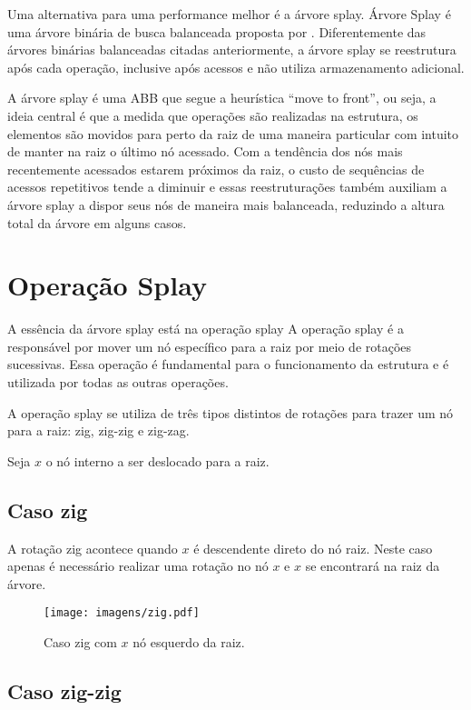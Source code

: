 Uma alternativa para uma performance melhor é a árvore splay. Árvore Splay é uma árvore binária de busca balanceada proposta por \cite{selfadjustingbst}. Diferentemente das árvores binárias balanceadas citadas anteriormente, a árvore splay se reestrutura após cada operação, inclusive após acessos e não utiliza armazenamento adicional.

A árvore splay é uma ABB que segue a heurística “move to front”, ou seja, a ideia central é que a medida que operações são realizadas na estrutura, os elementos são movidos para perto da raiz de uma maneira particular com intuito de manter na raiz o último nó acessado.
Com a tendência dos nós mais recentemente acessados estarem próximos da raiz, o custo de sequências de acessos repetitivos tende a diminuir e essas reestruturações também auxiliam a árvore splay a dispor seus nós de maneira mais balanceada, reduzindo a altura total da árvore em alguns casos.

\section{Operação Splay}

A essência da árvore splay está na operação splay A operação splay é a responsável por mover um nó específico para a raiz por meio de rotações sucessivas. Essa operação é fundamental para o funcionamento da estrutura e é utilizada por todas as outras operações.

A operação splay se utiliza de três tipos distintos de rotações para trazer um nó para a raiz: zig, zig-zig e zig-zag.

Seja $x$ o nó interno a ser deslocado para a raiz. 

\subsection{Caso zig}

A rotação zig acontece quando $x$ é descendente direto do nó raiz. Neste caso apenas é necessário realizar uma rotação no nó $x$ e $x$ se encontrará na raiz da árvore.

\begin{figure}[h]
    \centering
    \texttt{[image: imagens/zig.pdf]}
    \label{fig:zig}

\caption{Caso zig com $x$ nó esquerdo da raiz.}
\end{figure}

\subsection{Caso zig-zig}

